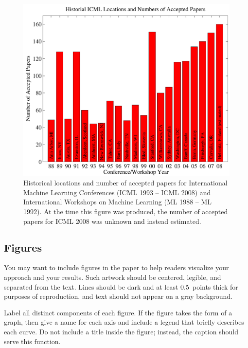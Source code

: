 \documentclass{article}
\begin{document}
\begin{figure}[ht]
\vskip 0.2in
\begin{center}
\centerline{\includegraphics[width=\columnwidth]{icml_numpapers}}
\caption{Historical locations and number of accepted papers for International
  Machine Learning Conferences (ICML 1993 -- ICML 2008) and
  International Workshops on Machine Learning (ML 1988 -- ML
  1992). At the time this figure was produced, the number of
  accepted papers for ICML 2008 was unknown and instead estimated.}
\label{icml-historical}
\end{center}
\vskip -0.2in
\end{figure}

\subsection{Figures}

You may want to include figures in the paper to help readers visualize
your approach and your results. Such artwork should be centered,
legible, and separated from the text. Lines should be dark and at
least 0.5~points thick for purposes of reproduction, and text should
not appear on a gray background.

Label all distinct components of each figure. If the figure takes the
form of a graph, then give a name for each axis and include a legend
that briefly describes each curve. Do not include a title inside the
figure; instead, the caption should serve this function.
\end{document}

